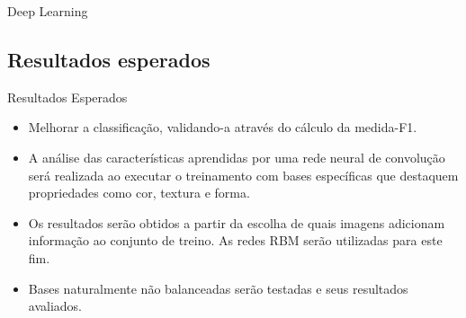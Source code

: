 \documentclass{beamer}
\begin{document}
\begin{frame}{Deep Learning}
\subsection{Resultados esperados}
\begin{frame}{Resultados Esperados}

\begin{itemize}
\item Melhorar a classificação, validando-a através do cálculo da medida-F1. 
\item A análise das características aprendidas por uma rede neural de convolução será realizada ao executar o treinamento com bases específicas que destaquem propriedades como cor, textura e forma. 
\item Os resultados serão obtidos a partir da escolha de quais imagens adicionam informação ao conjunto de treino. As redes RBM serão utilizadas para este fim. 
\item Bases naturalmente não balanceadas serão testadas e seus resultados avaliados.
\end{itemize}




\end{frame}

\end{frame}
\end{document}
